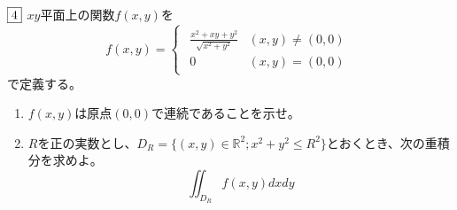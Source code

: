\documentclass[dvipdfmx]{jsreport}
\newcommand{\R}{\mathbb{R}}
\newcounter{num}[section]
\begin{document}
\begin{tcolorbox} %
	$\fbox{4}$ $xy$平面上の関数$f(x, y)$を
\begin{equation*}
	f(x, y)= 
\begin{cases}
\begin{matrix}
	\frac{x^2+ xy+ y^2}{\sqrt{x^2+ y^2}}& (x, y)\ne (0 ,0)\\
	0& (x, y)= (0, 0)
\end{matrix}
\end{cases}
\end{equation*}
	で定義する。
\begin{enumerate}
	\item $f(x, y)$は原点$(0, 0)$で連続であることを示せ。
	\item $R$を正の実数とし、$D_R= \{(x, y)\in \R^2; x^2+ y^2\le R^2\}$とおくとき、次の重積分を求めよ。
\begin{equation*}
	\iint_{D_R} f(x, y) dxdy
\end{equation*}
\end{enumerate}
\end{tcolorbox}
\end{document}
